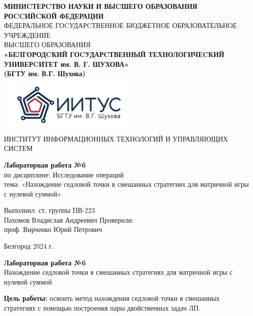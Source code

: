 \documentclass[a4paper,14pt]{extarticle}
\newcommand\textbox[1]{
	\parbox{.45\textwidth}{#1}
}
\begin{document}
\begin{center}
    \small{
        \textbf{МИНИCТЕРCТВО НАУКИ И ВЫCШЕГО ОБРАЗОВАНИЯ РОCCИЙCКОЙ ФЕДЕРАЦИИ}\\
        ФЕДЕРАЛЬНОЕ ГОCУДАРCТВЕННОЕ БЮДЖЕТНОЕ ОБРАЗОВАТЕЛЬНОЕ УЧРЕЖДЕНИЕ\\ВЫCШЕГО ОБРАЗОВАНИЯ \\
        \textbf{«БЕЛГОРОДCКИЙ ГОCУДАРCТВЕННЫЙ ТЕХНОЛОГИЧЕCКИЙ\\УНИВЕРCИТЕТ им. В. Г. ШУХОВА»\\ (БГТУ им. В.Г. Шухова)} \\
        \bigbreak
        \includegraphics[width=70mm]{log}\\
        ИНСТИТУТ ИНФОРМАЦИОННЫХ ТЕХНОЛОГИЙ И УПРАВЛЯЮЩИХ СИСТЕМ\\}
\end{center}

\vfill
\begin{center}
    \large{
        \textbf{
            Лабораторная работа №6}}\\
    \normalsize{
        по дисциплине: Исследование операций \\
        тема: «Нахождение седловой точки в смешанных стратегиях для
        матричной игры с нулевой суммой»}
\end{center}
\vfill
\hfill\textbox{
    Выполнил: ст. группы ПВ-223\\Пахомов Владислав Андреевич
    \bigbreak
    Проверили: \\проф. Вирченко Юрий Петрович
}
\vfill\begin{center}
    Белгород 2024 г.
\end{center}
\newpage
\begin{center}
    \textbf{Лабораторная работа №6}\\
    Нахождение седловой точки в смешанных стратегиях для
матричной игры с нулевой суммой\\
\end{center}
\textbf{Цель работы: }освоить метод нахождения седловой точки в
смешанных стратегиях с помощью построения пары двойственных
задач ЛП.\\
\end{document}
